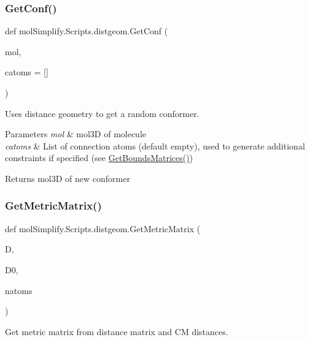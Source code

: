 \subsubsection{\texorpdfstring{Get\+Conf()}{GetConf()}}
{\footnotesize\ttfamily def mol\+Simplify.\+Scripts.\+distgeom.\+Get\+Conf (\begin{DoxyParamCaption}\item[{}]{mol,  }\item[{}]{catoms = {\ttfamily \mbox{[}\mbox{]}} }\end{DoxyParamCaption})}



Uses distance geometry to get a random conformer. 


\begin{DoxyParams}{Parameters}
{\em mol} & mol3D of molecule \\
\hline
{\em catoms} & List of connection atoms (default empty), used to generate additional constraints if specified (see \hyperlink{namespacemolSimplify_1_1Scripts_1_1distgeom_a511e618a1e62d7d1ad97e26692c62a42}{Get\+Bounds\+Matrices()}) \\
\hline
\end{DoxyParams}
\begin{DoxyReturn}{Returns}
mol3D of new conformer 
\end{DoxyReturn}
\mbox{\label{namespacemolSimplify_1_1Scripts_1_1distgeom_a4cab2a5d58e3b87a21782fe674644556}} 
\subsubsection{\texorpdfstring{Get\+Metric\+Matrix()}{GetMetricMatrix()}}
{\footnotesize\ttfamily def mol\+Simplify.\+Scripts.\+distgeom.\+Get\+Metric\+Matrix (\begin{DoxyParamCaption}\item[{}]{D,  }\item[{}]{D0,  }\item[{}]{natoms }\end{DoxyParamCaption})}



Get metric matrix from distance matrix and CM distances. 

